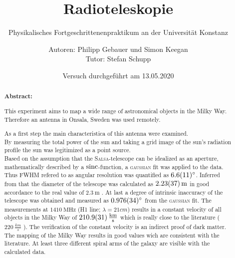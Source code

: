 \title{Radioteleskopie}
\subtitle{Physikalisches Fortgeschrittenenpraktikum an der Universität Konstanz}
\author{Autoren: Philipp Gebauer und Simon Keegan \\ \large{Tutor: Stefan Schupp}}
\date{Versuch durchgeführt am 13.05.2020}
\maketitle
\vspace{2.5 cm}
\begin{abstract}
    \vspace{1cm}
    \noindent \textbf{Abstract:}
    \begin{singlespace}
    This experiment aims to map a wide range of astronomical objects in the Milky Way. Therefore an antenna in Onsala, Sweden was used remotely.

    As a first step the main characteristica of this antenna were examined.\\
    By measuring the total power of the sun and taking a grid image of the sun's radiation profile the sun was legitimized as a point source. \\
    Based on the assumption that the \textsc{Salsa}-telescope can be idealized as an aperture, mathematically described by a $\operatorname{sinc}$-function, a \textsc{gaussian} fit was applied to the data. Thus FWHM refered to as angular resolution was quantified as $\SI{6.6 \pm 1.1}{\degree}$. Inferred from that the diameter of the telescope was calculated as $\SI{2.23 \pm 0.37}{\metre}$ in good accordance to the real value of $\SI{2.3}{\metre}$ \cite{Usermanual}. At last a degree of intrinsic inaccuracy of the telescope was obtained and measured as $\SI{0.976 \pm 0.034}{\degree}$ from the \textsc{gaussian} fit.\newline
    The measurements at $\SI{1410}{\mega \hertz}$ (H1 line; $\lambda = \si{21}{cm}$) results in a constant velocity of all objects in the Milky Way of $\SI{210.9 \pm 3.1}{\frac{km}{s}}$ which is really close to the literature ($\SI{220}{\frac{km}{s}}$ \cite{LSR}). The verification of the constant velocity is an indirect proof of dark matter.\newline
    The mapping of the Milky Way results in good values wich are consistent with the literature. At least three different spiral arms of the galaxy are visible with the calculated data.
    \end{singlespace}
\end{abstract}
\thispagestyle{empty}
\newpage